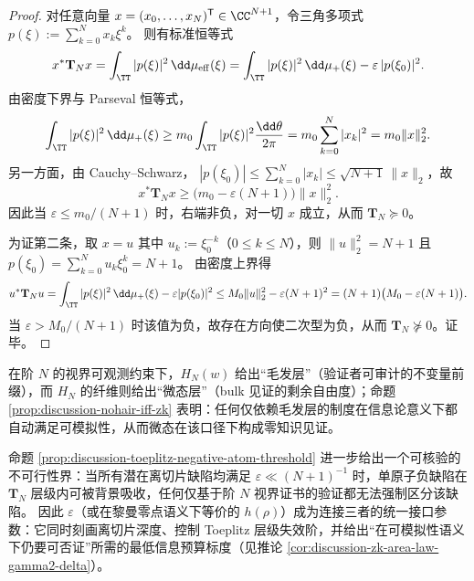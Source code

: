 \begin{proof}
对任意向量 \(x=(x_0,\dots,x_N)^{\mathsf T}\in\CC^{N+1}\)，令三角多项式
\(
p(\xi):=\sum_{k=0}^{N}x_k\xi^k
\)。
则有标准恒等式
\[
x^\ast \mathbf{T}_N x
=\int_{\TT}|p(\xi)|^2\,\dd\mu_{\mathrm{eff}}(\xi)
=\int_{\TT}|p(\xi)|^2\,\dd\mu_+(\xi)-\varepsilon\,|p(\xi_0)|^2.
\]
由密度下界与 Parseval 恒等式，
\[
\int_{\TT}|p(\xi)|^2\,\dd\mu_+(\xi)
\ge m_0\int_{\TT}|p(\xi)|^2\frac{\dd\theta}{2\pi}
=m_0\sum_{k=0}^{N}|x_k|^2
=m_0\|x\|_2^2.
\]
另一方面，由 Cauchy--Schwarz，
\(
|p(\xi_0)|
\le \sum_{k=0}^{N}|x_k|
\le \sqrt{N+1}\,\|x\|_2
\)，故
\[
x^\ast \mathbf{T}_N x
\ge \bigl(m_0-\varepsilon(N+1)\bigr)\|x\|_2^2.
\]
因此当 \(\varepsilon\le m_0/(N+1)\) 时，右端非负，对一切 \(x\) 成立，从而 \(\mathbf{T}_N\succeq 0\)。
\par
为证第二条，取 \(x=u\) 其中 \(u_k:=\xi_0^{-k}\)（\(0\le k\le N\)），则 \(\|u\|_2^2=N+1\) 且 \(p(\xi_0)=\sum_{k=0}^{N}u_k\xi_0^k=N+1\)。
由密度上界得
\[
u^\ast \mathbf{T}_N u
=\int_{\TT}|p(\xi)|^2\,\dd\mu_+(\xi)-\varepsilon|p(\xi_0)|^2
\le M_0\|u\|_2^2-\varepsilon(N+1)^2
=(N+1)\bigl(M_0-\varepsilon(N+1)\bigr).
\]
当 \(\varepsilon> M_0/(N+1)\) 时该值为负，故存在方向使二次型为负，从而 \(\mathbf{T}_N\not\succeq 0\)。证毕。
\end{proof}

\begin{remark}[毛发 \texorpdfstring{$=$}{=} 可验证不变量；微态 \texorpdfstring{$=$}{=} 零知识见证；\texorpdfstring{$\varepsilon$}{eps} 为统一接口参数]\label{rem:discussion-hair-microstate-eps-interface}
在阶 \(N\) 的视界可观测约束下，\(H_N(w)\) 给出“毛发层”（验证者可审计的不变量前缀），而 \(H_N\) 的纤维则给出“微态层”（bulk 见证的剩余自由度）；命题 \ref{prop:discussion-nohair-iff-zk} 表明：任何仅依赖毛发层的制度在信息论意义下都自动满足可模拟性，从而微态在该口径下构成零知识见证。
\par
命题 \ref{prop:discussion-toeplitz-negative-atom-threshold} 进一步给出一个可核验的不可行性界：当所有潜在离切片缺陷均满足 \(\varepsilon\ll (N+1)^{-1}\) 时，单原子负缺陷在 \(\mathbf{T}_N\) 层级内可被背景吸收，任何仅基于阶 \(N\) 视界证书的验证都无法强制区分该缺陷。
因此 \(\varepsilon\)（或在黎曼零点语义下等价的 \(h(\rho)\)）成为连接三者的统一接口参数：它同时刻画离切片深度、控制 Toeplitz 层级失效阶，并给出“在可模拟性语义下仍要可否证”所需的最低信息预算标度（见推论 \ref{cor:discussion-zk-area-law-gamma2-delta}）。
\end{remark}


